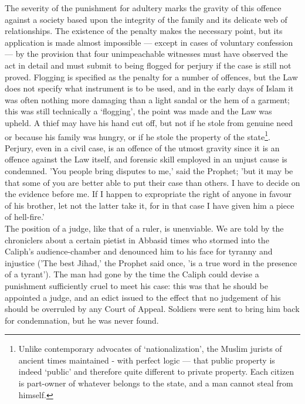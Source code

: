 \documentclass[10pt, twoside]{book}
\begin{document}
The severity of the punishment for adultery marks the gravity of this offence against a society based 
upon the integrity of the family and its delicate web of relationships. The existence of the penalty 									
makes the necessary point, but its application is made almost impossible --- except in cases of 
voluntary confession --- by the provision that four unimpeachable witnesses must have observed the act in 
detail and must submit to being flogged for perjury if the case is still not proved. Flogging is 
specified as the penalty for a number of offences, but the Law does not specify what instrument is to 
be used, and in the early days of Islam it was often nothing more damaging than a light sandal or the 
hem of a garment; this was still technically a `flogging', the point was made and the Law was upheld. 
A thief may have his hand cut off, but not if he stole from genuine need or because his family was 
hungry, or if he stole the property of the state\footnote{Unlike contemporary advocates of `nationalization', the Muslim jurists of ancient times maintained 
- with perfect logic --- that public property is indeed `public' and therefore quite different to 
private property. Each citizen is part\hyp{}owner of whatever belongs to the state, and a man cannot steal 
from himself.}. \\

Perjury, even in a civil case, is an offence of the utmost gravity since it is an offence against the 
Law itself, and forensic skill employed in an unjust cause is condemned. 'You people bring disputes 
to me,' said the Prophet; 'but it may be that some of you are better able to put their case than 
others. I have to decide on the evidence before me. If I happen to expropriate the right of anyone in 
favour of his brother, let not the latter take it, for in that case I have given him a piece of 
hell-fire.' \\

The position of a judge, like that of a ruler, is unenviable. We are told by the chroniclers about a 
certain pietist in Abbasid times who stormed into the Caliph's audience\hyp{}chamber and denounced him to 
his face for tyranny and injustice ('The best Jihad,' the Prophet said once, 'is a true word in the 
presence of a tyrant'). The man had gone by the time the Caliph could devise a punishment 
sufficiently cruel to meet his case: this was that he should be appointed a judge, and an edict 
issued to the effect that no judgement of his should be overruled by any Court of Appeal. Soldiers 
were sent to bring him back for condemnation, but he was never found. \\
\end{document}

